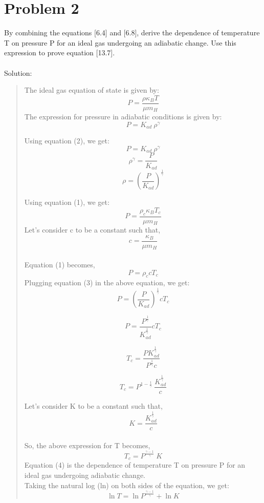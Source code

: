 \documentclass[10pt]{article}
\begin{document}
\section*{Problem 2}
By combining the equations [6.4] and [6.8], derive the dependence of temperature T on pressure P for an ideal gas undergoing an adiabatic change. Use this expression to prove equation [13.7].\\ \\
Solution:

\setlength{\parindent}{1cm}
\begin{quote}
The ideal gas equation of state is given by:
\begin{equation}
     P = \frac{\rho \kappa_{B} T }{\mu m_{H}}
\end{equation}
The expression for pressure in adiabatic conditions is given by:
\begin{equation}
    P = K_{ad} \  \rho^{\gamma}
\end{equation}

Using equation (2), we get:
\[ P = K_{ad} \  \rho^{\gamma} \]
\[ \rho^{\gamma} = \frac{P}{K_{ad}}\]
\begin{equation}
    \rho = (\frac{P}{K_{ad}})^{\frac{1}{\gamma}}
\end{equation}

Using equation (1), we get:
\[ P = \frac{\rho_c \kappa_{B} T_{c} }{\mu m_{H}} \]
Let's consider c to be a constant such that,
\[ c = \frac{\kappa_{B}}{\mu m_{H}} \]
\\ 
Equation (1) becomes, 
\[ P = \rho_{c} c T_{c}\]  
Plugging equation (3) in the above equation, we get:
\[ P = (\frac{P}{K_{ad}})^{\frac{1}{\gamma}} c T_{c}\]

\[ P = \frac{P^{\frac{1}{\gamma}}}{K_{ad}^{\frac{1}{\gamma}}} c T_{c} \]

\[ T_{c} = \frac{P K_{ad}^{\frac{1}{\gamma}}}{P^{\frac{1}{\gamma}}c}\]

\[ T_{c} = P^{1 - \frac{1}{\gamma}} \ \frac{K_{ad}^{\frac{1}{\gamma}}}{c}\]

Let's consider K to be a constant such that,
\[ K = \frac{K_{ad}^{\frac{1}{\gamma}}}{c}\]
\\
So, the above expression for T becomes,
\begin{equation}
    T_{c} = P^{\frac{\gamma - 1}{\gamma}} \ K
\end{equation}
Equation (4) is the dependence of temperature T on pressure P for an ideal gas undergoing adiabatic change.
\\
Taking the natural log (ln) on both sides of the equation, we get:
\[ \ln{T} = \ln{P^{\frac{\gamma - 1}{\gamma}}} + \ln{K}\]


\end{quote}
\end{document}
